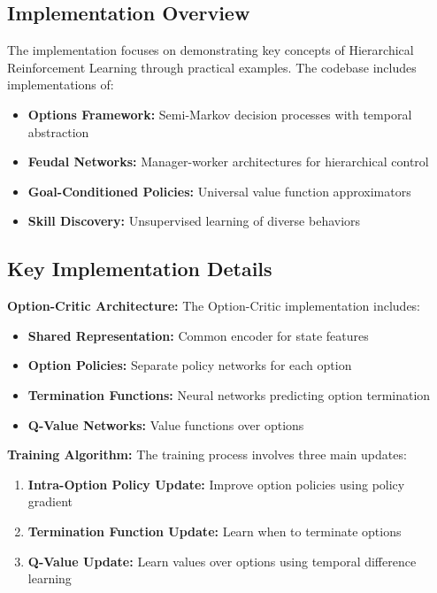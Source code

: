 \documentclass[12pt]{article}
\begin{document}
{{\subsection{Implementation Overview}

The implementation focuses on demonstrating key concepts of Hierarchical Reinforcement Learning through practical examples. The codebase includes implementations of:

\begin{itemize}
    \item \textbf{Options Framework:} Semi-Markov decision processes with temporal abstraction
    \item \textbf{Feudal Networks:} Manager-worker architectures for hierarchical control
    \item \textbf{Goal-Conditioned Policies:} Universal value function approximators
    \item \textbf{Skill Discovery:} Unsupervised learning of diverse behaviors
\end{itemize}

\subsection{Key Implementation Details}

\textbf{Option-Critic Architecture:}
The Option-Critic implementation includes:
\begin{itemize}
    \item \textbf{Shared Representation:} Common encoder for state features
    \item \textbf{Option Policies:} Separate policy networks for each option
    \item \textbf{Termination Functions:} Neural networks predicting option termination
    \item \textbf{Q-Value Networks:} Value functions over options
\end{itemize}

\textbf{Training Algorithm:}
The training process involves three main updates:
\begin{enumerate}
    \item \textbf{Intra-Option Policy Update:} Improve option policies using policy gradient
    \item \textbf{Termination Function Update:} Learn when to terminate options
    \item \textbf{Q-Value Update:} Learn values over options using temporal difference learning
\end{enumerate}

}}
\end{document}
